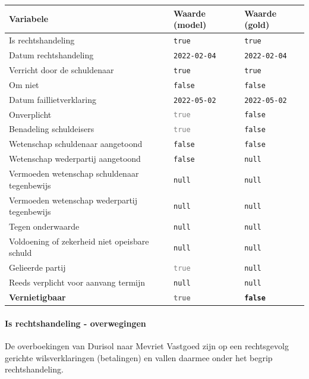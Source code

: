 \documentclass[
  dutch,
  a4paper,
]{article}
\begin{document}
\begin{center}
\small
\begin{tabular}{@{}p{7.4cm}p{2.6cm}p{2.6cm}@{}}
\toprule
Variabele & Waarde (model) & Waarde (gold) \\
\midrule
Is rechtshandeling & \texttt{true} & \texttt{true} \\
Datum rechtshandeling & \texttt{2022-02-04} & \texttt{2022-02-04} \\
Verricht door de schuldenaar & \texttt{true} & \texttt{true} \\
Om niet & \texttt{false} & \texttt{false} \\
Datum faillietverklaring & \texttt{2022-05-02} & \texttt{2022-05-02} \\
Onverplicht & \textcolor{gray}{\texttt{true}} & \texttt{false} \\
Benadeling schuldeisers & \textcolor{gray}{\texttt{true}} & \texttt{false} \\
Wetenschap schuldenaar aangetoond & \texttt{false} & \texttt{false} \\
Wetenschap wederpartij aangetoond & \texttt{false} & \texttt{null} \\
Vermoeden wetenschap schuldenaar tegenbewijs & \texttt{null} & \texttt{null} \\
Vermoeden wetenschap wederpartij tegenbewijs & \texttt{null} & \texttt{null} \\
Tegen onderwaarde & \texttt{null} & \texttt{null} \\
Voldoening of zekerheid niet opeisbare schuld & \texttt{null} & \texttt{null} \\
Gelieerde partij & \textcolor{gray}{\texttt{true}} & \texttt{null} \\
Reeds verplicht voor aanvang termijn & \texttt{null} & \texttt{null} \\
\textbf{Vernietigbaar} & \textbf{\textcolor{gray}{\texttt{true}}} & \textbf{\texttt{false}} \\
\bottomrule
\end{tabular}
\end{center}

\paragraph{Is rechtshandeling - overwegingen}\label{is-rechtshandeling---overwegingen-9}

De overboekingen van Durisol naar Mevriet Vastgoed zijn op een rechtsgevolg gerichte wilsverklaringen (betalingen) en vallen daarmee onder het begrip rechtshandeling.
\end{document}
